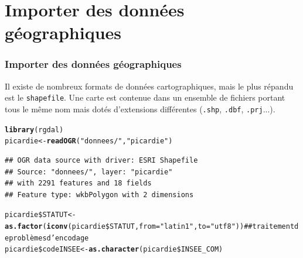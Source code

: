 \documentclass[slidetop, 10pt]{beamer}\usepackage{graphicx, color}
\makeatletter
\newcommand{\hlfunctioncall}[1]{\textcolor[rgb]{0.501960784313725,0,0.329411764705882}{\textbf{#1}}}%
\newcommand{\hlstring}[1]{\textcolor[rgb]{0.6,0.6,1}{#1}}%
\newenvironment{kframe}{%
 \def\at@end@of@kframe{}%
 \ifinner\ifhmode%
  \def\at@end@of@kframe{\end{minipage}}%
  \begin{minipage}{\columnwidth}%
 \fi\fi%
 \def\FrameCommand##1{\hskip\@totalleftmargin \hskip-\fboxsep
 \colorbox{shadecolor}{##1}\hskip-\fboxsep
     \hskip-\linewidth \hskip-\@totalleftmargin \hskip\columnwidth}%
 \MakeFramed {\advance\hsize-\width
   \@totalleftmargin\z@ \linewidth\hsize
   \@setminipage}}%
 {\par\unskip\endMakeFramed%
 \at@end@of@kframe}
\newenvironment{knitrout}{}{} %
\renewenvironment{knitrout}{\begin{tiny}}{\end{tiny}}
\makeatother
\begin{document}
\section{Importer des données géographiques}
\begin{frame}[fragile]
\frametitle{Importer des données géographiques}

Il existe de nombreux formats de données cartographiques, mais le plus répandu est le \verb!shapefile!. Une carte est contenue dans un ensemble de fichiers portant tous le même nom mais dotés d'extensions différentes (\verb!.shp!, \verb!.dbf!, \verb!.prj!...). 

\begin{knitrout}\tiny
{}\color{fgcolor}\begin{kframe}
\begin{alltt}
\hlfunctioncall{library}(rgdal)
picardie <- \hlfunctioncall{readOGR}(\hlstring{"donnees/"}, \hlstring{"picardie"})
\end{alltt}
\begin{verbatim}
## OGR data source with driver: ESRI Shapefile 
## Source: "donnees/", layer: "picardie"
## with 2291 features and 18 fields
## Feature type: wkbPolygon with 2 dimensions
\end{verbatim}
\begin{alltt}
picardie\$STATUT <- \hlfunctioncall{as.factor}(\hlfunctioncall{iconv}(picardie\$STATUT, from = \hlstring{"latin1"}, to = \hlstring{"utf8"}))  ## traitement de problèmes d'encodage
picardie\$codeINSEE <- \hlfunctioncall{as.character}(picardie\$INSEE\_COM)
\end{alltt}
\end{kframe}
\end{knitrout}

\end{frame}
\end{document}
